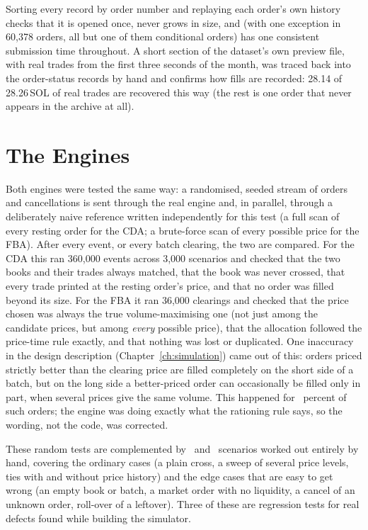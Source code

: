 Sorting every record by order number and replaying each order's own history checks
that it is opened once, never grows in size, and (with one exception in 60,378
orders, all but one of them conditional orders) has one consistent submission time
throughout. A short section of the dataset's own preview file, with real trades from
the first three seconds of the month, was traced back into the order-status records
by hand and confirms how fills are recorded: 28.14 of 28.26\,SOL of real trades are
recovered this way (the rest is one order that never appears in the archive at all).

\section{The Engines}
\label{sec:testfba}

Both engines were tested the same way: a randomised, seeded stream of orders and
cancellations is sent through the real engine and, in parallel, through a
deliberately naive reference written independently for this test (a full scan of
every resting order for the CDA; a brute-force scan of every possible price for the
FBA). After every event, or every batch clearing, the two are compared. For the CDA
this ran 360,000 events across 3,000 scenarios and checked that the two books and
their trades always matched, that the book was never crossed, that every trade
printed at the resting order's price, and that no order was filled beyond its size.
For the FBA it ran 36,000 clearings and checked that the price chosen was always the
true volume-maximising one (not just among the candidate prices, but among
\emph{every} possible price), that the allocation followed the price-time rule
exactly, and that nothing was lost or duplicated. One inaccuracy in the design
description (Chapter~\ref{ch:simulation}) came out of this: orders priced strictly
better than the clearing price are filled completely on the short side of a batch,
but on the long side a better-priced order can occasionally be filled only in part,
when several prices give the same volume. This happened for \VerFbaBetterPct\
percent of such orders; the engine was doing exactly what the rationing rule says,
so the wording, not the code, was corrected.

These random tests are complemented by \VerChecklistCda\ and \VerChecklistFba\
scenarios worked out entirely by hand, covering the ordinary cases (a plain cross, a
sweep of several price levels, ties with and without price history) and the edge
cases that are easy to get wrong (an empty book or batch, a market order with no
liquidity, a cancel of an unknown order, roll-over of a leftover). Three of these
are regression tests for real defects found while building the simulator.

